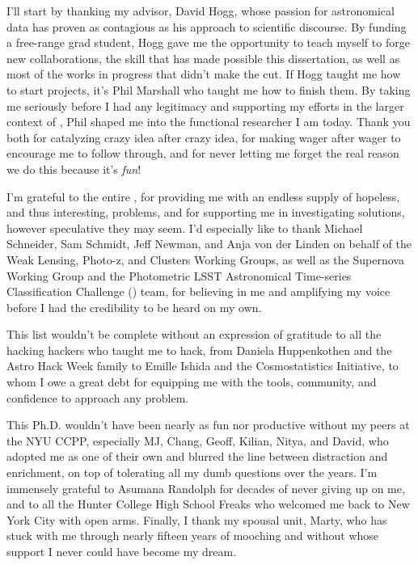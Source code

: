 I'll start by thanking my advisor, David Hogg, whose passion for astronomical data has proven as contagious as his approach to scientific discourse.
By funding a free-range grad student, Hogg gave me the opportunity to teach myself to forge new collaborations, the skill that has made possible this dissertation, as well as most of the works in progress that didn't make the cut.
If Hogg taught me how to start projects, it's Phil Marshall who taught me how to finish them.
By taking me seriously before I had any legitimacy and supporting my efforts in the larger context of \desc, Phil shaped me into the functional researcher I am today.
Thank you both for catalyzing crazy idea after crazy idea, for making wager after wager to encourage me to follow through, and for never letting me forget the real reason we do this \textemdash because it's \textit{fun}!

I'm grateful to the entire \desc, for providing me with an endless supply of hopeless, and thus interesting, problems, and for supporting me in investigating solutions, however speculative they may seem. 
I'd especially like to thank Michael Schneider, Sam Schmidt, Jeff Newman, and Anja von der Linden on behalf of the Weak Lensing, Photo-z, and Clusters Working Groups, as well as the Supernova Working Group and the Photometric LSST Astronomical Time-series Classification Challenge () team, for believing in me and amplifying my voice before I had the credibility to be heard on my own.

This list wouldn't be complete without an expression of gratitude to all the hacking hackers who taught me to hack, from Daniela Huppenkothen and the Astro Hack Week family to Emille Ishida and the Cosmostatistics Initiative, to whom I owe a great debt for equipping me with the tools, community, and confidence to approach any problem.


This Ph.D. wouldn't have been nearly as fun nor productive without my peers at the NYU CCPP, especially MJ, Chang, Geoff, Kilian, Nitya, and David, who adopted me as one of their own and blurred the line between distraction and enrichment, on top of tolerating all my dumb questions over the years.
I'm immensely grateful to Asumana Randolph for decades of never giving up on me, and to all the Hunter College High School Freaks who welcomed me back to New York City with open arms.
Finally, I thank my spousal unit, Marty, who has stuck with me through nearly fifteen years of mooching and without whose support I never could have become my dream.